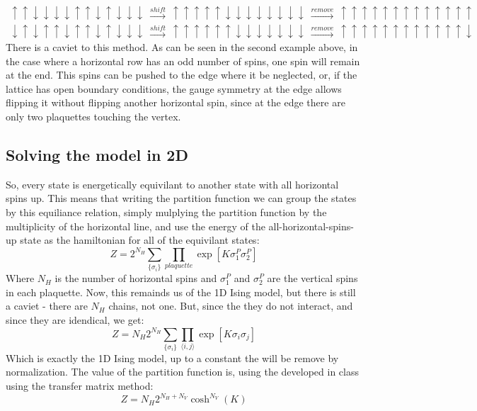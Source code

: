 \documentclass{article}
\begin{document}
\begin{equation*}
\begin{gathered}
    \uparrow\uparrow\downarrow\downarrow\downarrow\downarrow\uparrow\uparrow\downarrow\uparrow\downarrow\downarrow\downarrow \ \overset{shift}{\longrightarrow} \
    \uparrow\uparrow\uparrow\uparrow\uparrow\downarrow\downarrow\downarrow\downarrow\downarrow\downarrow\downarrow\downarrow \ \overset{remove}{\longrightarrow} \
    \uparrow\uparrow\uparrow\uparrow\uparrow\uparrow\uparrow\uparrow\uparrow\uparrow\uparrow\uparrow\uparrow
    \\
    \downarrow\uparrow\downarrow\uparrow\uparrow\downarrow\uparrow\uparrow\downarrow\uparrow\downarrow\downarrow\downarrow \ \overset{shift}{\longrightarrow} \ 
    \uparrow\uparrow\uparrow\uparrow\uparrow\uparrow\downarrow\downarrow\downarrow\downarrow\downarrow\downarrow\downarrow \ \overset{remove}{\longrightarrow} \ 
    \uparrow\uparrow\uparrow\uparrow\uparrow\uparrow\uparrow\uparrow\uparrow\uparrow\uparrow\uparrow\downarrow
\end{gathered}
\end{equation*}
\newline
There is a caviet to this method. As can be seen in the second example above, in the case where a horizontal row has an odd number of spins, one spin will remain at the end. This spins can be pushed to the edge where it be neglected, or, if the lattice has open boundary conditions, the gauge symmetry at the edge allows flipping it without flipping another horizontal spin, since at the edge there are only two plaquettes touching the vertex.
\subsection{Solving the model in 2D}
So, every state is energetically equivilant to another state with all horizontal spins up. This means that writing the partition function we can group the states by this equiliance relation, simply mulplying the partition function by the multiplicity of the horizontal line, and use the energy of the all-horizontal-spins-up state as the hamiltonian for all of the equivilant states:
\begin{equation}
    Z = 2^{N_H} \sum_{\{\sigma_i\}} \prod_{plaquette} \exp[K\sigma_1^P\sigma_2^P]
\end{equation}
Where $N_H$ is the number of horizontal spins and $\sigma_1^P$ and $\sigma_2^P$ are the vertical spins in each plaquette. Now, this remainds us of the 1D Ising model, but there is still a caviet - there are $N_H$ chains, not one. But, since the they do not interact, and since they are idendical, we get:
\begin{equation}
    Z = N_H 2^{N_H} \sum_{\{\sigma_i\}} \prod_{\langle i,j \rangle} \exp[K\sigma_i\sigma_j]
\end{equation}
Which is exactly the 1D Ising model, up to a constant the will be remove by normalization. The value of the partition function is, using the developed in class using the transfer matrix method:
\begin{equation}
    Z = N_H 2^{N_H + N_V} \cosh^{N_V}(K)
\end{equation}
\end{document}
